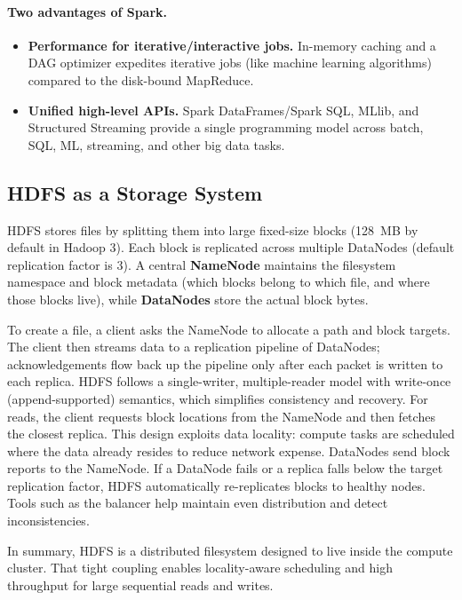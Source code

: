 \documentclass[11pt]{article}
\begin{document}
\paragraph{Two advantages of Spark.}
\begin{itemize}
  \item \textbf{Performance for iterative/interactive jobs.} In-memory caching and a DAG optimizer expedites iterative jobs (like machine learning algorithms) compared to the disk-bound MapReduce.
  \item \textbf{Unified high-level APIs.} Spark DataFrames/Spark SQL, MLlib, and Structured Streaming provide a single programming model across batch, SQL, ML, streaming, and other big data tasks.
\end{itemize}

\subsection{HDFS as a Storage System}
\label{sec:hdfs_storage}

HDFS stores files by splitting them into large fixed-size blocks (128~MB by default in Hadoop 3). Each block is replicated across multiple DataNodes (default replication factor is 3). A central \textbf{NameNode} maintains the filesystem namespace and block metadata (which blocks belong to which file, and where those blocks live), while \textbf{DataNodes} store the actual block bytes.

To create a file, a client asks the NameNode to allocate a path and block targets. The client then streams data to a replication pipeline of DataNodes; acknowledgements flow back up the pipeline only after each packet is written to each replica. HDFS follows a single-writer, multiple-reader model with write-once (append-supported) semantics, which simplifies consistency and recovery. For reads, the client requests block locations from the NameNode and then fetches the closest replica. This design exploits data locality: compute tasks are scheduled where the data already resides to reduce network expense. DataNodes send block reports to the NameNode. If a DataNode fails or a replica falls below the target replication factor, HDFS automatically re-replicates blocks to healthy nodes. Tools such as the balancer help maintain even distribution and detect inconsistencies. 

In summary, HDFS is a distributed filesystem designed to live inside the compute cluster. That tight coupling enables locality-aware scheduling and high throughput for large sequential reads and writes.
\end{document}
